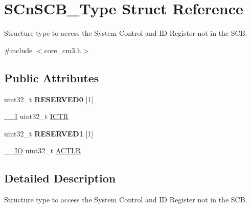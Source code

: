 \hypertarget{struct_s_cn_s_c_b___type}{\section{S\-Cn\-S\-C\-B\-\_\-\-Type Struct Reference}
\label{struct_s_cn_s_c_b___type}
}


Structure type to access the System Control and I\-D Register not in the S\-C\-B.  




{\ttfamily \#include $<$core\-\_\-cm3.\-h$>$}

\subsection*{Public Attributes}
\begin{DoxyCompactItemize}
\item 
\hypertarget{struct_s_cn_s_c_b___type_a9c1cf408b90b40c62f396da41416290f}{uint32\-\_\-t {\bfseries R\-E\-S\-E\-R\-V\-E\-D0} \mbox{[}1\mbox{]}}\label{struct_s_cn_s_c_b___type_a9c1cf408b90b40c62f396da41416290f}

\item 
\hyperlink{group___c_m_s_i_s__core__definitions_gaf63697ed9952cc71e1225efe205f6cd3}{\-\_\-\-\_\-\-I} uint32\-\_\-t \hyperlink{struct_s_cn_s_c_b___type_ad99a25f5d4c163d9005ca607c24f6a98}{I\-C\-T\-R}
\item 
\hypertarget{struct_s_cn_s_c_b___type_a7343aadfc9e7a15e58c26b67c5d576c1}{uint32\-\_\-t {\bfseries R\-E\-S\-E\-R\-V\-E\-D1} \mbox{[}1\mbox{]}}\label{struct_s_cn_s_c_b___type_a7343aadfc9e7a15e58c26b67c5d576c1}

\item 
\hyperlink{group___c_m_s_i_s__core__definitions_gaec43007d9998a0a0e01faede4133d6be}{\-\_\-\-\_\-\-I\-O} uint32\-\_\-t \hyperlink{struct_s_cn_s_c_b___type_aacadedade30422fed705e8dfc8e6cd8d}{A\-C\-T\-L\-R}
\end{DoxyCompactItemize}


\subsection{Detailed Description}
Structure type to access the System Control and I\-D Register not in the S\-C\-B. 

